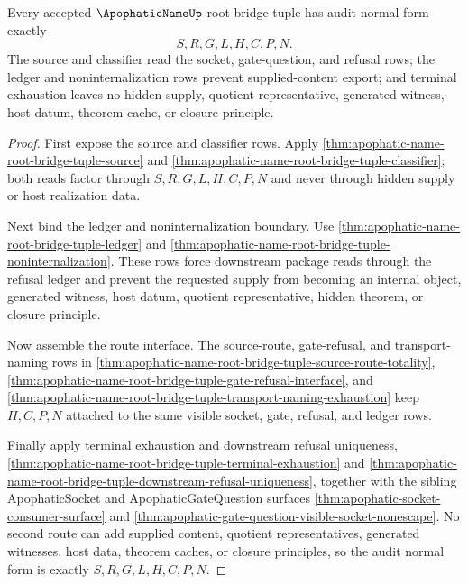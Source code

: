 \begin{theorem}
\label{thm:apophatic-name-root-bridge-tuple-audit-normal-form}
Every accepted $\ApophaticNameUp$ root bridge tuple has audit normal form exactly
$$
S,R,G,L,H,C,P,N.
$$
The source and classifier read the socket, gate-question, and refusal rows; the ledger and noninternalization rows prevent supplied-content export; and terminal exhaustion leaves no hidden supply, quotient representative, generated witness, host datum, theorem cache, or closure principle.
\end{theorem}
\begin{proof}
First expose the source and classifier rows. Apply \autoref{thm:apophatic-name-root-bridge-tuple-source} and \autoref{thm:apophatic-name-root-bridge-tuple-classifier}; both reads factor through $S,R,G,L,H,C,P,N$ and never through hidden supply or host realization data.

Next bind the ledger and noninternalization boundary. Use \autoref{thm:apophatic-name-root-bridge-tuple-ledger} and \autoref{thm:apophatic-name-root-bridge-tuple-noninternalization}. These rows force downstream package reads through the refusal ledger and prevent the requested supply from becoming an internal object, generated witness, host datum, quotient representative, hidden theorem, or closure principle.

Now assemble the route interface. The source-route, gate-refusal, and transport-naming rows in \autoref{thm:apophatic-name-root-bridge-tuple-source-route-totality}, \autoref{thm:apophatic-name-root-bridge-tuple-gate-refusal-interface}, and \autoref{thm:apophatic-name-root-bridge-tuple-transport-naming-exhaustion} keep $H,C,P,N$ attached to the same visible socket, gate, refusal, and ledger rows.

Finally apply terminal exhaustion and downstream refusal uniqueness, \autoref{thm:apophatic-name-root-bridge-tuple-terminal-exhaustion} and \autoref{thm:apophatic-name-root-bridge-tuple-downstream-refusal-uniqueness}, together with the sibling ApophaticSocket and ApophaticGateQuestion surfaces \autoref{thm:apophatic-socket-consumer-surface} and \autoref{thm:apophatic-gate-question-visible-socket-nonescape}. No second route can add supplied content, quotient representatives, generated witnesses, host data, theorem caches, or closure principles, so the audit normal form is exactly $S,R,G,L,H,C,P,N$.
\end{proof}

